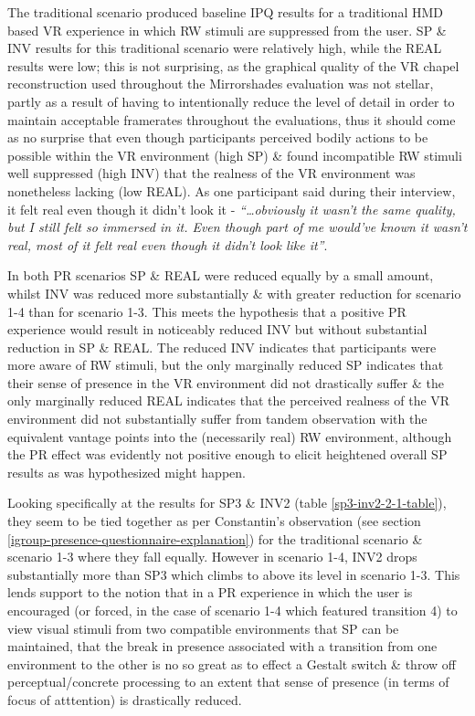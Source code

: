 The traditional scenario produced baseline IPQ results for a traditional HMD based VR experience in which RW stimuli are suppressed from the user. SP \& INV results for this traditional scenario were relatively high, while the REAL results were low; this is not surprising, as the graphical quality of the VR chapel reconstruction used throughout the Mirrorshades evaluation was not stellar, partly as a result of having to intentionally reduce the level of detail in order to maintain acceptable framerates throughout the evaluations, thus it should come as no surprise that even though participants perceived bodily actions to be possible within the VR environment (high SP) \& found incompatible RW stimuli well suppressed (high INV) that the realness of the VR environment was nonetheless lacking (low REAL). As one participant said during their interview, it felt real even though it didn't look it - \textit{``\ldots obviously it wasn't the same quality, but I still felt so immersed in it. Even though part of me would've known it wasn't real, most of it felt real even though it didn't look like it''}.

In both PR scenarios SP \& REAL were reduced equally by a small amount, whilst INV was reduced more substantially \& with greater reduction for scenario 1-4 than for scenario 1-3. This meets the hypothesis that a positive PR experience would result in noticeably reduced INV but without substantial reduction in SP \& REAL. The reduced INV indicates that participants were more aware of RW stimuli, but the only marginally reduced SP indicates that their sense of presence in the VR environment did not drastically suffer \& the only marginally reduced REAL indicates that the perceived realness of the VR environment did not substantially suffer from tandem observation with the equivalent vantage points into the (necessarily real) RW environment, although the PR effect was evidently not positive enough to elicit heightened overall SP results as was hypothesized might happen.

Looking specifically at the results for SP3 \& INV2 (table \ref{sp3-inv2-2-1-table}), they seem to be tied together as per Constantin's observation (see section \ref{igroup-presence-questionnaire-explanation}) for the traditional scenario \& scenario 1-3 where they fall equally. However in scenario 1-4, INV2 drops substantially more than SP3 which climbs to above its level in scenario 1-3. This lends support to the notion that in a PR experience in which the user is encouraged (or forced, in the case of scenario 1-4 which featured transition 4) to view visual stimuli from two compatible environments that SP can be maintained, that the break in presence associated with a transition from one environment to the other is no so great as to effect a Gestalt switch \& throw off perceptual/concrete processing to an extent that sense of presence (in terms of focus of atttention) is drastically reduced.

